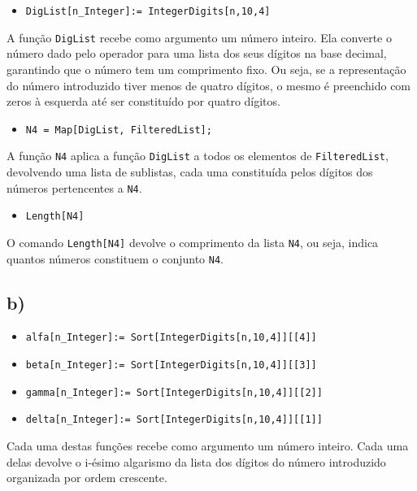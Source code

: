 \documentclass[12pt,a4paper]{article}
\begin{document}
        \begin{itemize}
            \item \texttt{DigList[n\_Integer]:= IntegerDigits[n,10,4]}
        \end{itemize}
        
        A função \texttt{DigList} recebe como argumento um número inteiro. Ela converte o número dado pelo operador para uma lista dos seus dígitos na base decimal, garantindo que o número tem um comprimento fixo. Ou seja, se a representação do número introduzido tiver menos de quatro dígitos, o mesmo é preenchido com zeros à esquerda até ser constituído por quatro dígitos.

        \begin{itemize}
            \item \texttt{N4 = Map[DigList, FilteredList];}
        \end{itemize}
        
        A função \texttt{N4} aplica a função \texttt{DigList} a todos os elementos de \texttt{FilteredList}, devolvendo uma lista de sublistas, cada uma constituída pelos dígitos dos números pertencentes a \texttt{N4}.

        \begin{itemize}
            \item \texttt{Length[N4]}
        \end{itemize}
        
        O comando \texttt{Length[N4]} devolve o comprimento da lista \texttt{N4}, ou seja, indica quantos números constituem o conjunto \texttt{N4}.

    \subsection{b)}
        \begin{itemize}
            \item \texttt{alfa[n\_Integer]:= Sort[IntegerDigits[n,10,4]][[4]]}
            \item \texttt{beta[n\_Integer]:= Sort[IntegerDigits[n,10,4]][[3]]}
            \item \texttt{gamma[n\_Integer]:= Sort[IntegerDigits[n,10,4]][[2]]}
            \item \texttt{delta[n\_Integer]:= Sort[IntegerDigits[n,10,4]][[1]]}
        \end{itemize}
        
        Cada uma destas funções recebe como argumento um número inteiro. Cada uma delas devolve o i-ésimo algarismo da lista dos dígitos do número introduzido organizada por ordem crescente.
\end{document}

